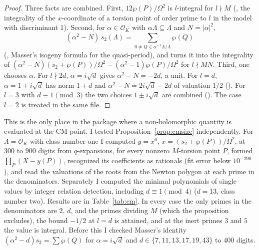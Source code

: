 \documentclass[11pt]{article}
\theoremstyle{remark}
\begin{document}
\begin{proof}
Three facts are combined. First, $12\wp(P)/\Omega^2$ is $l$-integral for $l\nmid M$ (, the integrality of the $x$-coordinate of a torsion point of order prime to $l$ in the model with discriminant $1$). Second, for $\alpha\in\mathcal O_K$ with $\alpha\Lambda\subseteq\Lambda$ and $N=\lvert\alpha\rvert^2$,
\[
(\alpha^2-N)\,s_2(\Lambda)=\sum_{0\ne Q\in\alpha^{-1}\Lambda/\Lambda}\wp(Q)
\]
(, Masser's isogeny formula for the quasi-period), and  turns it into the integrality of $(\alpha^2-N)(s_2+\wp(P))/\Omega^2-(\alpha^2-1)\wp(P)/\Omega^2$ for $l\nmid MN$. Third, one chooses $\alpha$. For $l\nmid2d$, $\alpha=i\sqrt d$ gives $\alpha^2-N=-2d$, a unit. For $l=d$, $\alpha=1+i\sqrt d$ has norm $1+d$ and $\alpha^2-N=2i\sqrt d-2d$ of valuation $1/2$ (). For $l=3$ with $d\equiv1\pmod3$ the two choices $1\pm i\sqrt d$ are combined (). The case $l=2$ is treated in the same file.
\end{proof}

This is the only place in the package where a non-holomorphic quantity is evaluated at the CM point. I tested Proposition~\ref{prop:cmsize} independently. For $\Lambda=\mathcal O_K$ with class number one I computed $y=x^6$, $x=(s_2+\wp(P))/\Omega^2$, at $300$ to $900$ digits from $q$-expansions, for every nonzero $M$-torsion point $P$, formed $\prod_P(X-y(P))$, recognized its coefficients as rationals (fit error below $10^{-290}$), and read the valuations of the roots from the Newton polygon at each prime in the denominators. Separately I computed the minimal polynomials of single values by integer relation detection, including $d\equiv1\pmod4$ ($d=13$, class number two). Results are in Table~\ref{tab:cm}. In every case the only primes in the denominators are $2$, $d$, and the primes dividing $M$ (which the proposition excludes), the bound $-1/2$ at $l=d$ is attained, and at the inert primes $3$ and $5$ the value is integral. Before this I checked Masser's identity $(\alpha^2-d)s_2=\sum\wp(Q)$ for $\alpha=i\sqrt d$ and $d\in\{7,11,13,17,19,43\}$ to $400$ digits.
\end{document}
